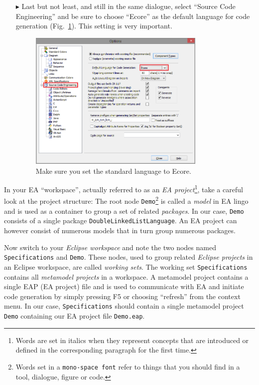 \begin{itemize}
\item[$\blacktriangleright$] Last but not least, and still in the same dialogue, select ``Source Code Engineering'' and be sure to choose ``Ecore'' as the default language for code generation (Fig.~\ref{fig_standardSCEEA}). 
This setting is very important.
\begin{figure}
  \centering
  \includegraphics[width=0.8\textwidth]{pics/installationAndSetup/standardCodeEngineering}
  \caption{Make sure you set the standard language to Ecore.}
  \label{fig_standardSCEEA}
\end{figure}
\end{itemize}

In your EA ``workspace'', actually referred to as an \emph{EA project}\footnote{Words are set in italics when they represent concepts that are introduced or defined  in the corresponding paragraph for the first time.}, take a careful  look at the project structure:  The root node \texttt{Demo}\footnote{Words set  in a \texttt{mono-space font} refer to things that you should find in a tool,  dialogue, figure or code.} is called a \emph{model} in EA lingo and is used as a  container to group a set of related \emph{packages}. 
In our case, \texttt{Demo}  consists of a single package \texttt{DoubleLinkedListLanguage}.
An EA project can however consist of numerous models that in turn group  numerous packages.

Now switch to your \emph{Eclipse workspace} and note the two nodes named \texttt{Spe\-ci\-fi\-ca\-tions} and \texttt{Demo}.  These nodes, used to group related \emph{Eclipse projects} in an Eclipse workspace, are called \emph{working sets}.
The working set \texttt{Spe\-ci\-fi\-ca\-tions} contains all \emph{metamodel projects} in a  workspace.
A metamodel project contains a single EAP (EA project) file and is used to communicate with EA and initiate code generation by simply pressing F5 or choosing ``refresh'' from the context menu.
In our case, \texttt{Specifications} should contain a single metamodel project \texttt{Demo} containing our EA project file  \texttt{Demo.eap}.

